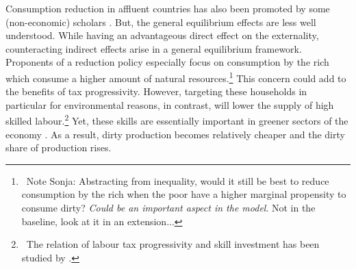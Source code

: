 % 


 Consumption reduction in affluent countries has also been promoted by some (non-economic) scholars \citep{Schor2005SustainableReduction, Pullinger2014WorkingDesign, Arrow2004AreMuch}. But, the general equilibrium effects are less well understood.
While having an advantageous direct effect on the externality, counteracting indirect effects arise in a general equilibrium framework. Proponents of a reduction policy especially focus on consumption by the rich which consume a higher amount of natural resources.\footnote{\ Note Sonja: Abstracting from inequality, would it still be best to reduce consumption by the rich when the poor have a higher marginal propensity to consume dirty? \textit{Could be an important aspect in the model}. Not in the baseline, look at it in an extension...}
This concern could add to the benefits of tax progressivity.
However, targeting these households in particular for environmental reasons, in contrast, will lower the supply of high skilled labour.\footnote{\ The relation of labour tax progressivity and skill investment has been studied by \cite{Heathcote2017OptimalFramework}.} Yet, these skills are essentially important in greener sectors of the economy \citep{Consoli2016DoCapital}. As a result, dirty production becomes relatively cheaper and the dirty share of production rises. 

